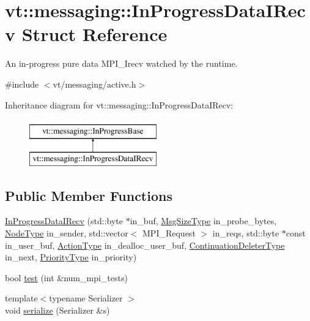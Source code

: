 \hypertarget{structvt_1_1messaging_1_1_in_progress_data_i_recv}{}\section{vt\+:\+:messaging\+:\+:In\+Progress\+Data\+I\+Recv Struct Reference}
\label{structvt_1_1messaging_1_1_in_progress_data_i_recv}


An in-\/progress pure data M\+P\+I\+\_\+\+Irecv watched by the runtime.  




{\ttfamily \#include $<$vt/messaging/active.\+h$>$}

Inheritance diagram for vt\+:\+:messaging\+:\+:In\+Progress\+Data\+I\+Recv\+:\begin{figure}[H]
\begin{center}
\leavevmode
\includegraphics[height=2.000000cm]{structvt_1_1messaging_1_1_in_progress_data_i_recv}
\end{center}
\end{figure}
\subsection*{Public Member Functions}
\begin{DoxyCompactItemize}
\item 
\hyperlink{structvt_1_1messaging_1_1_in_progress_data_i_recv_ade6ceb29a94d9adcfd05a5ff0c6e4383}{In\+Progress\+Data\+I\+Recv} (std\+::byte $\ast$in\+\_\+buf, \hyperlink{namespacevt_a408e86a8c7c89309b52907dc5a513924}{Msg\+Size\+Type} in\+\_\+probe\+\_\+bytes, \hyperlink{namespacevt_a866da9d0efc19c0a1ce79e9e492f47e2}{Node\+Type} in\+\_\+sender, std\+::vector$<$ M\+P\+I\+\_\+\+Request $>$ in\+\_\+reqs, std\+::byte $\ast$const in\+\_\+user\+\_\+buf, \hyperlink{namespacevt_ae0a5a7b18cc99d7b732cb4d44f46b0f3}{Action\+Type} in\+\_\+dealloc\+\_\+user\+\_\+buf, \hyperlink{namespacevt_a6de3bd201e2a040be9362d9d24d1e446}{Continuation\+Deleter\+Type} in\+\_\+next, \hyperlink{namespacevt_a86bff9f556eb761b27fc8600d006ac04}{Priority\+Type} in\+\_\+priority)
\item 
bool \hyperlink{structvt_1_1messaging_1_1_in_progress_data_i_recv_a5d7e51732503e70a684f27a8c2985dc9}{test} (int \&num\+\_\+mpi\+\_\+tests)
\item 
{\footnotesize template$<$typename Serializer $>$ }\\void \hyperlink{structvt_1_1messaging_1_1_in_progress_data_i_recv_afa4efb5376b20b0acfc7e5d789818f49}{serialize} (Serializer \&s)
\end{DoxyCompactItemize}

